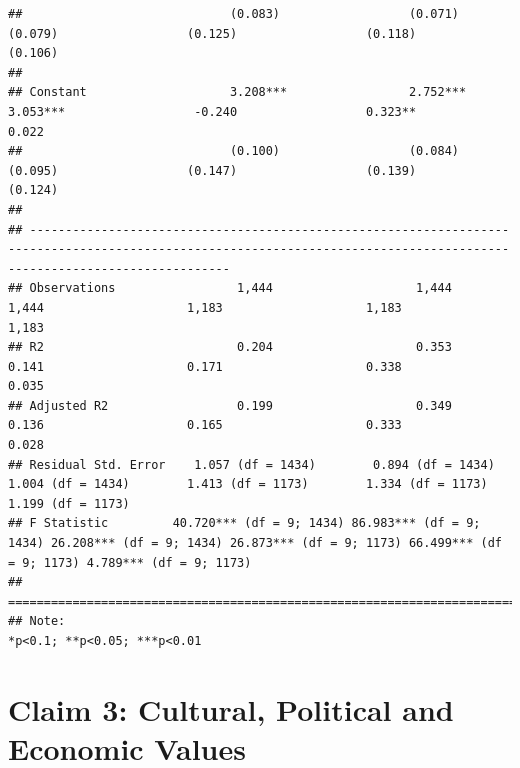\documentclass[
]{article}
\begin{document}
\begin{verbatim}
##                             (0.083)                  (0.071)                  (0.079)                  (0.125)                  (0.118)                  (0.106)        
##                                                                                                                                                                         
## Constant                    3.208***                 2.752***                 3.053***                  -0.240                  0.323**                   0.022         
##                             (0.100)                  (0.084)                  (0.095)                  (0.147)                  (0.139)                  (0.124)        
##                                                                                                                                                                         
## ------------------------------------------------------------------------------------------------------------------------------------------------------------------------
## Observations                 1,444                    1,444                    1,444                    1,183                    1,183                    1,183         
## R2                           0.204                    0.353                    0.141                    0.171                    0.338                    0.035         
## Adjusted R2                  0.199                    0.349                    0.136                    0.165                    0.333                    0.028         
## Residual Std. Error    1.057 (df = 1434)        0.894 (df = 1434)        1.004 (df = 1434)        1.413 (df = 1173)        1.334 (df = 1173)        1.199 (df = 1173)   
## F Statistic         40.720*** (df = 9; 1434) 86.983*** (df = 9; 1434) 26.208*** (df = 9; 1434) 26.873*** (df = 9; 1173) 66.499*** (df = 9; 1173) 4.789*** (df = 9; 1173)
## ========================================================================================================================================================================
## Note:                                                                                                                                        *p<0.1; **p<0.05; ***p<0.01
\end{verbatim}

\newpage

\hypertarget{claim-3-cultural-political-and-economic-values}{%
\section{Claim 3: Cultural, Political and Economic
Values}\label{claim-3-cultural-political-and-economic-values}}
\end{document}
